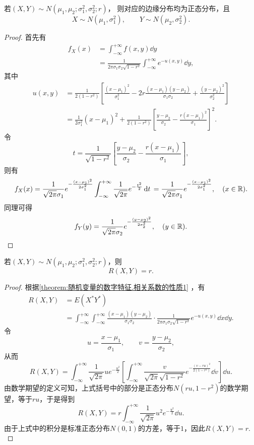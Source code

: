 \begin{theorem}\label{theorem:正态分布与自然指数分布族.性质1}
若\((X,Y) \sim N(\mu_1,\mu_2;\sigma_1^2,\sigma_2^2;r)\)，%
则对应的边缘分布均为正态分布，且\[
X \sim N(\mu_1,\sigma_1^2),
\qquad
Y \sim N(\mu_2,\sigma_2^2).
\]
\begin{proof}
首先有
\begin{align*}
f_X(x) &= \int_{-\infty}^{+\infty} f(x,y) \dd{y} \\
&= \frac{1}{2\pi\sigma_1\sigma_2\sqrt{1-r^2}}
	\int_{-\infty}^{+\infty} e^{-u(x,y)} \dd{y},
\end{align*}
其中\begin{align*}
u(x,y)
&= \frac{1}{2(1-r^2)} \left[
		\frac{(x-\mu_1)^2}{\sigma_1^2}
		-2r\frac{(x-\mu_1)(y-\mu_2)}{\sigma_1\sigma_2}
		+\frac{(y-\mu_2)^2}{\sigma_2^2}
	\right] \\
&= \frac{1}{2 \sigma_1^2} (x-\mu_1)^2
	+ \frac{1}{2(1-r^2)} \left[
		\frac{y-\mu_2}{\sigma_2}
		- \frac{r(x-\mu_1)^2}{\sigma_1}
	\right]^2.
\end{align*}
令\[
t = \frac{1}{\sqrt{1-r^2}} \left[
\frac{y-\mu_2}{\sigma_2}
- \frac{r(x-\mu_1)}{\sigma_1}
\right],
\]则有\[
f_X(x)
= \frac{1}{\sqrt{2\pi} \sigma_1} e^{-\frac{(x-\mu_1)^2}{2\sigma_1^2}} \int_{-\infty}^{+\infty} \frac{1}{\sqrt{2\pi}} e^{-\frac{t^2}{2}} \dd{t} \\
= \frac{1}{\sqrt{2\pi} \sigma_1} e^{-\frac{(x-\mu_1)^2}{2\sigma_1^2}},
\quad(x\in\mathbb{R}).
\]
同理可得\[
f_Y(y)
= \frac{1}{\sqrt{2\pi} \sigma_2} e^{-\frac{(y-\mu_2)^2}{2\sigma_2^2}},
\quad(y\in\mathbb{R}).
\qedhere
\]
\end{proof}
\end{theorem}

\begin{theorem}\label{theorem:正态分布与自然指数分布族.性质2}
若\((X,Y) \sim N(\mu_1,\mu_2;\sigma_1^2,\sigma_2^2;r)\)，则\[
R(X,Y) = r.
\]
\begin{proof}
根据\cref{theorem:随机变量的数字特征.相关系数的性质1} ，有\begin{align*}
R(X,Y)
&= E(X^* Y^*) \\
&= \int_{-\infty}^{+\infty} \int_{-\infty}^{+\infty}
	\frac{(x-\mu_1)(y-\mu_2)}{\sigma_1 \sigma_2}
	\cdot
	\frac{1}{2\pi \sigma_1 \sigma_2 \sqrt{1-r^2}}
	e^{-u(x,y)}
	\dd{x} \dd{y}.
\end{align*}
{%
\def\u{u}%
\def\v{v}%
\def\intx{\int_{-\infty}^{+\infty}}%
令\[
\u = \frac{x-\mu_1}{\sigma_1},
\qquad
\v = \frac{y-\mu_2}{\sigma_2},
\]从而\[
R(X,Y)
= \intx
	\frac{1}{\sqrt{2\pi}}
	\u e^{-\frac{\u^2}{2}}
	\left[
		\intx
		\frac{\v}{\sqrt{2\pi} \sqrt{1-r^2}}
		e^{-\frac{(\v-r\u)^2}{2(1-r^2)}}
		\dd\v
	\right]
	\dd\u.
\]由数学期望的定义可知，上式括号中的部分是正态分布\(N(r\u,1-r^2)\)的数学期望，等于\(r\u\)，于是得到\[
R(X,Y)
= r \intx \frac{1}{\sqrt{2\pi}} \u^2 e^{-\frac{\u^2}{2}} \dd\u.
\]由于上式中的积分是标准正态分布\(N(0,1)\)的方差，等于\(1\)，因此\(R(X,Y) = r\).
}%
\end{proof}
\end{theorem}

